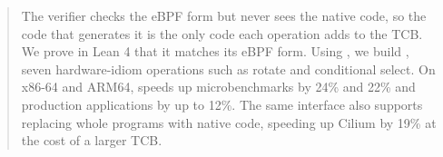 \begin{abstract}
The verifier checks the eBPF form but never sees the native code, so the code that generates it is the only code each operation adds to the TCB. We prove in Lean 4 that it matches its eBPF form.
Using \tool, we build \lang, seven hardware-idiom operations such as rotate and conditional select.
On x86-64 and ARM64, \lang speeds up microbenchmarks by 24\% and 22\% and production applications by up to 12\%.
The same interface also supports replacing whole programs with native code, speeding up Cilium by 19\% at the cost of a larger TCB.
\end{abstract}
